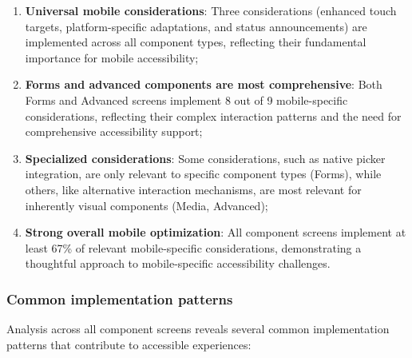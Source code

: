 \begin{enumerate}
    \item \textbf{Universal mobile considerations}: Three considerations (enhanced touch targets, platform-specific adaptations, and status announcements) are implemented across all component types, reflecting their fundamental importance for mobile accessibility;
    
    \item \textbf{Forms and advanced components are most comprehensive}: Both Forms and Advanced screens implement 8 out of 9 mobile-specific considerations, reflecting their complex interaction patterns and the need for comprehensive accessibility support;
    
    \item \textbf{Specialized considerations}: Some considerations, such as native picker integration, are only relevant to specific component types (Forms), while others, like alternative interaction mechanisms, are most relevant for inherently visual components (Media, Advanced);
    
    \item \textbf{Strong overall mobile optimization}: All component screens implement at least 67\% of relevant mobile-specific considerations, demonstrating a thoughtful approach to mobile-specific accessibility challenges.
\end{enumerate}

\subsubsection{Common implementation patterns}

Analysis across all component screens reveals several common implementation patterns that contribute to accessible experiences:

